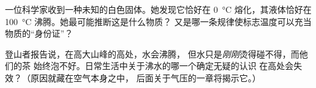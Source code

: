 \begin{exercise}[$\star\star$]\label{exo:g4:changes-of-state:10}
一位科学家收到一种未知的白色固体。她发现它恰好在
\qty{0}{\celsius} 熔化，其液体恰好在
\qty{100}{\celsius} 沸腾。她最可能推断这是什么物质？
又是哪一条规律使标志温度可以充当物质的“身份证”？
\end{exercise}

\begin{exercise}[$\star\star$]\label{exo:g4:changes-of-state:11}
登山者报告说，在高大山峰的高处，水会沸腾，
但水只是\emph{刚刚}烫得碰不得，而他们的茶
始终泡不好。日常生活中关于沸水的哪一个确定无疑的认识
在高处会失效？（原因就藏在空气本身之中，
后面关于气压的一章将揭示它。）
\end{exercise}

